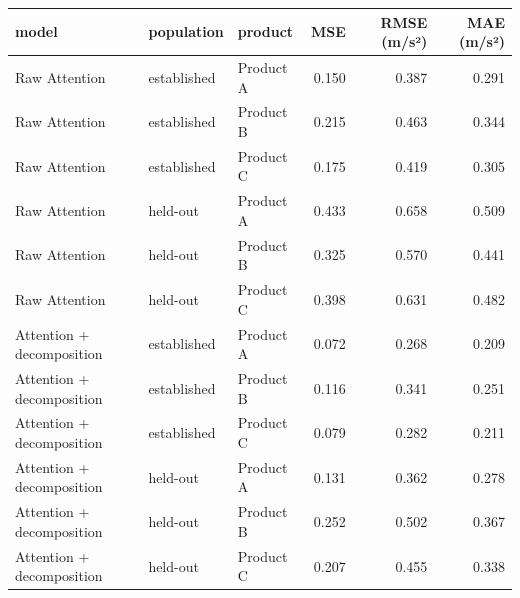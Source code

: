 \begin{tabular}{lllrrr}
\toprule
model & population & product & MSE & RMSE (m/s²) & MAE (m/s²) \\
\midrule
Raw Attention & established & Product A & 0.150 & 0.387 & 0.291 \\
Raw Attention & established & Product B & 0.215 & 0.463 & 0.344 \\
Raw Attention & established & Product C & 0.175 & 0.419 & 0.305 \\
Raw Attention & held-out & Product A & 0.433 & 0.658 & 0.509 \\
Raw Attention & held-out & Product B & 0.325 & 0.570 & 0.441 \\
Raw Attention & held-out & Product C & 0.398 & 0.631 & 0.482 \\
Attention + decomposition & established & Product A & 0.072 & 0.268 & 0.209 \\
Attention + decomposition & established & Product B & 0.116 & 0.341 & 0.251 \\
Attention + decomposition & established & Product C & 0.079 & 0.282 & 0.211 \\
Attention + decomposition & held-out & Product A & 0.131 & 0.362 & 0.278 \\
Attention + decomposition & held-out & Product B & 0.252 & 0.502 & 0.367 \\
Attention + decomposition & held-out & Product C & 0.207 & 0.455 & 0.338 \\
\bottomrule
\end{tabular}
